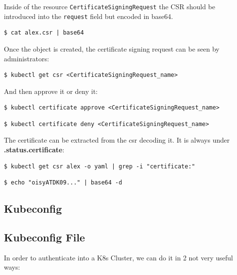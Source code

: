 \documentclass{article}
\newenvironment{blocktemplateIII}[1]{%
    \tcolorbox[beamer,%
    noparskip,breakable,
    ,colframe=Red,%
    colbacklower=LimeGreen!75!LightGreen,%
    title=#1]}%
    {\endtcolorbox}
\newenvironment{codetemplate}[1][]{%
  \mybasecolorbox[#1]
  \itshape
}{%
  \endmybasecolorbox
}
\begin{document}
\begin{blocktemplateIII}{WARNING}
Inside of the resource \verb|CertificateSigningRequest| the CSR should be introduced into the \verb|request| field
but encoded in base64.
\begin{codetemplate}{}
\begin{verbatim}
$ cat alex.csr | base64
\end{verbatim}
\end{codetemplate}
\end{blocktemplateIII}

Once the object is created, the certificate signing request can be seen by administrators:
\begin{codetemplate}{}
\begin{verbatim}
$ kubectl get csr <CertificateSigningRequest_name>
\end{verbatim}
\end{codetemplate}

And then approve it or deny it:
\begin{codetemplate}{}
\begin{verbatim}
$ kubectl certificate approve <CertificateSigningRequest_name>
\end{verbatim}
\end{codetemplate}
\begin{codetemplate}{}
\begin{verbatim}
$ kubectl certificate deny <CertificateSigningRequest_name>
\end{verbatim}
\end{codetemplate}

The certificate can be extracted from the csr decoding it. It is always under \textbf{.status.certificate}:
\begin{codetemplate}{}
\begin{verbatim}
$ kubectl get csr alex -o yaml | grep -i "certificate:"
\end{verbatim}
\end{codetemplate}
\begin{codetemplate}{}
\begin{verbatim}
$ echo "oisyATDK09..." | base64 -d
\end{verbatim}
\end{codetemplate}

\subsection{Kubeconfig}
\subsection{Kubeconfig File}
In order to authenticate into a K8s Cluster, we can do it in 2 not very useful ways:
\end{document}
